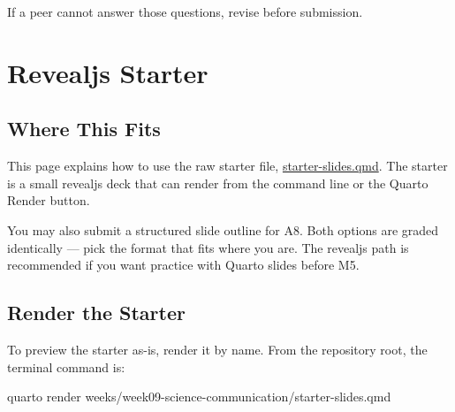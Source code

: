 \documentclass[
  letterpaper,
  DIV=11,
  numbers=noendperiod,
  oneside]{scrreprt}
\newenvironment{Shaded}{\begin{snugshade}}{\end{snugshade}}
\newcommand{\ExtensionTok}[1]{\textcolor[rgb]{0.00,0.23,0.31}{#1}}
\newcommand{\NormalTok}[1]{\textcolor[rgb]{0.00,0.23,0.31}{#1}}
\begin{document}
If a peer cannot answer those questions, revise before submission.

\chapter*{Revealjs Starter}\label{revealjs-starter}


\section*{Where This Fits}\label{where-this-fits-19}


This page explains how to use the raw starter file,
\url{starter-slides.qmd}. The starter is a small revealjs deck that can
render from the command line or the Quarto Render button.

You may also submit a structured slide outline for A8. Both options are
graded identically --- pick the format that fits where you are. The
revealjs path is recommended if you want practice with Quarto slides
before M5.

\section*{Render the Starter}\label{render-the-starter}


To preview the starter as-is, render it by name. From the repository
root, the terminal command is:

\begin{Shaded}
\begin{Highlighting}[numbers=left,,]
\ExtensionTok{quarto}\NormalTok{ render weeks/week09{-}science{-}communication/starter{-}slides.qmd}
\end{Highlighting}
\end{Shaded}
\end{document}
